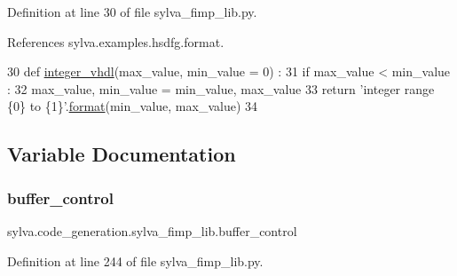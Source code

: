 Definition at line 30 of file sylva\+\_\+fimp\+\_\+lib.\+py.



References sylva.\+examples.\+hsdfg.\+format.


\begin{DoxyCode}
30 \textcolor{keyword}{def }\hyperlink{namespacesylva_1_1code__generation_1_1sylva__fimp__lib_acdc15946f5f6a217b6075944dbbd5f59}{integer\_vhdl}(max\_value, min\_value = 0) :
31   \textcolor{keywordflow}{if} max\_value < min\_value :
32     max\_value, min\_value = min\_value, max\_value
33   \textcolor{keywordflow}{return} \textcolor{stringliteral}{'integer range \{0\} to \{1\}'}.\hyperlink{namespacesylva_1_1examples_1_1hsdfg_ab3510a0b8457362330aa4d9fd2209590}{format}(min\_value, max\_value)
34 
\end{DoxyCode}


\subsection{Variable Documentation}
\mbox{\label{namespacesylva_1_1code__generation_1_1sylva__fimp__lib_a9f1e1b1e1118dcbfe55055475a342229}} 
\subsubsection{\texorpdfstring{buffer\+\_\+control}{buffer\_control}}
{\footnotesize\ttfamily sylva.\+code\+\_\+generation.\+sylva\+\_\+fimp\+\_\+lib.\+buffer\+\_\+control}



Definition at line 244 of file sylva\+\_\+fimp\+\_\+lib.\+py.

\mbox{\label{namespacesylva_1_1code__generation_1_1sylva__fimp__lib_af6787c82713f43b5d369232721d15a2e}} 
